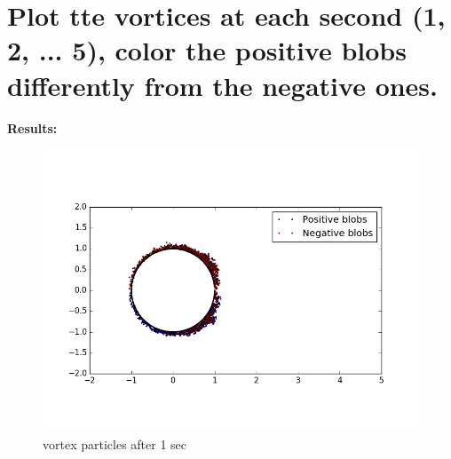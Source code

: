 \documentclass[a4paper,11pt]{article}
\begin{document}
\newpage

\section{Plot tte vortices at each second (1, 2, ... 5), color the positive blobs differently from the negative ones.}

\textbf{Results:}\\


\begin{figure}[ht]
    \centering
    \includegraphics[width=.8\linewidth]{rb_1.png}
    \caption{vortex particles after 1 sec}
    \label{fig:ex}    
\end{figure}
\end{document}
